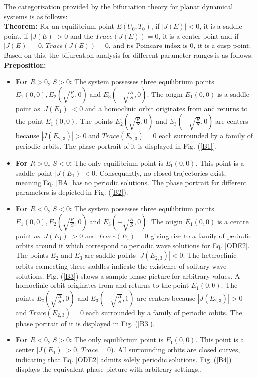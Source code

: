 \documentclass{article}
\numberwithin{equation}{section}
\begin{document}
\noindent
\newpage
The categorization provided by the bifurcation theory for planar dynamical systems is as follows:\\
\textbf{Theorem:} For an equilibrium point $E(U_{0}, T_{0})$, if $|J(E)| < 0$, it is a saddle point, if $|J(E)| > 0$ and the $Trace(J(E)) = 0$, it is a center point and if $|J(E)| = 0$, $Trace(J(E)) = 0$, and its Poincare index is $0$, it is a cusp point.\\
Based on this, the bifurcation analysis for different parameter ranges is as follows:\\
\textbf{Preposition:}
\begin{itemize}
  \item \textbf{For $R > 0$, $S > 0$:} The system possesses three equilibrium points $E_{1}(0, 0), E_{2}(\sqrt{\frac{R}{S}},0)$ and $E_{3}(-\sqrt{\frac{R}{S}}, 0)$. The origin $E_{1}(0, 0)$ is a saddle point as $|J(E_{1})| < 0$ and a homoclinic orbit originates from and returns to the point $E_{1}(0, 0)$. The points $E_{2}(\sqrt{\frac{R}{S}},0)$ and $E_{3}(-\sqrt{\frac{R}{S}}, 0)$ are centers because $|J(E_{2,3})| > 0$ and $Trace(E_{2,3})=0$ each surrounded by a family of periodic orbits. The phase portrait of it is displayed in Fig. (\ref{B1}).
  \item \textbf{For $R> 0$, $S < 0$:} The only equilibrium point is $E_{1}(0, 0)$. This point is a saddle point $|J(E_{1})| < 0$. Consequently, no closed trajectories exist, meaning Eq. \ref{BA} has no periodic solutions. The phase portrait for different parameters is depicted in Fig. (\ref{B2}).
  \item \textbf{For $R < 0$, $S < 0$:} The system possesses three equilibrium points $E_{1}(0, 0), E_{2}(\sqrt{\frac{R}{S}},0)$ and $E_{3}(-\sqrt{\frac{R}{S}}, 0)$. The origin $E_{1}(0, 0)$ is a centre point as $|J(E_{1})| > 0$ and $Trace(E_{1})=0$ giving rise to a family of periodic orbits around it which correspond to periodic wave solutions for Eq. \ref{ODE2}. The points $E_{2}$ and $E_{3}$ are saddle points $|J(E_{2,3})| < 0$. The heteroclinic orbits connecting these saddles indicate the existence of solitary wave solutions. Fig. (\ref{B3}) shows a sample phase picture for arbitrary values. A homoclinic orbit originates from and returns to the point $E_{1}(0, 0)$. The points $E_{2}(\sqrt{\frac{R}{S}},0)$ and $E_{3}(-\sqrt{\frac{R}{S}}, 0)$ are centers because $|J(E_{2,3})| > 0$ and $Trace(E_{2,3})=0$ each surrounded by a family of periodic orbits. The phase portrait of it is displayed in Fig. (\ref{B3}).
  \item \textbf{For $R < 0$, $S > 0$:} The only equilibrium point is $E_{1}(0, 0)$. This point is a center $|J(E_{1})| > 0$, $Trace=0$). All surrounding orbits are closed curves, indicating that Eq. \ref{ODE2} admits solely periodic solutions. Fig. (\ref{B4}) displays the equivalent phase picture with arbitrary settings..
\end{itemize}
\end{document}
